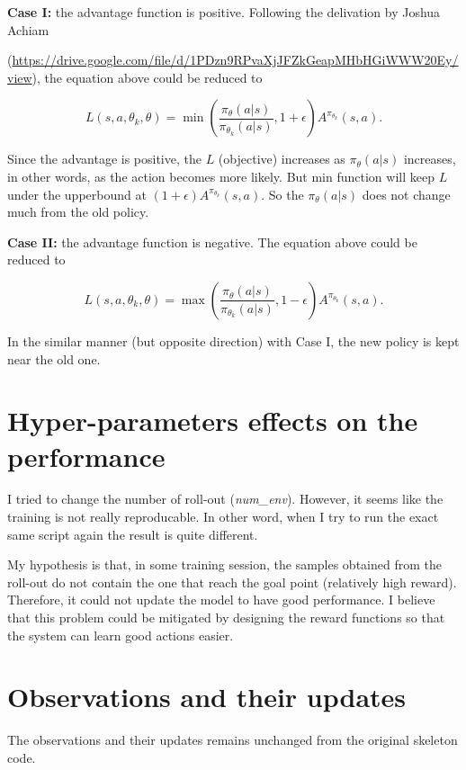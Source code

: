 \documentclass{article}
\begin{document}
    \textbf{Case I:} the advantage function is positive. 
    Following the delivation by Joshua Achiam 
    
    (\url{https://drive.google.com/file/d/1PDzn9RPvaXjJFZkGeapMHbHGiWWW20Ey/view}), 
    the equation above could be reduced to 

    $$ L(s, a, \theta_k, \theta) = \min\left(\frac{\pi_{\theta}(a|s)}{\pi_{\theta_k}(a|s)},
                                                1+\epsilon
                                        \right)
                                        A^{\pi_{\theta_k}}(s, a).$$

    Since the advantage is positive, the $L$ (objective) increases as $\pi_{\theta}(a|s)$ increases, 
    in other words, as the action becomes more likely. 
    But min function will keep $L$ under the upperbound at $(1+\epsilon)A^{\pi_{\theta_k}}(s, a)$. 
    So the $\pi_{\theta}(a|s)$ does not change much from the old policy.


    \textbf{Case II:} the advantage function is negative. The equation above could be reduced to 

    $$ L(s, a, \theta_k, \theta) = \max\left(\frac{\pi_{\theta}(a|s)}{\pi_{\theta_k}(a|s)},
                                                1-\epsilon
                                        \right)
                                        A^{\pi_{\theta_k}}(s, a).$$
    
    In the similar manner (but opposite direction) with Case I, the new policy is kept near the old one.




\section{Hyper-parameters effects on the performance}
    I tried to change the number of roll-out (\textit{num\_env}). 
However, it seems like the training is not really reproducable. 
In other word, when I try to run the exact same script again the result is quite different.

    My hypothesis is that, in some training session, the samples obtained from the roll-out do not contain 
the one that reach the goal point (relatively high reward). Therefore, it could not update the model to have good performance.
I believe that this problem could be mitigated by designing the reward functions so that the system can learn good actions easier. 


\section{Observations and their updates}
    The observations and their updates remains unchanged from the original skeleton code.
\end{document}
